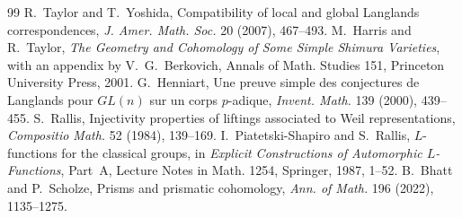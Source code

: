 \documentclass[11pt]{article}
\begin{document}
\begin{thebibliography}{99}
 R.~Taylor and T.~Yoshida, Compatibility of local and global Langlands correspondences, \emph{J. Amer. Math. Soc.} 20 (2007), 467--493.
 M.~Harris and R.~Taylor, \emph{The Geometry and Cohomology of Some Simple Shimura Varieties}, with an appendix by V.~G.~Berkovich, Annals of Math. Studies 151, Princeton University Press, 2001.
 G.~Henniart, Une preuve simple des conjectures de Langlands pour $GL(n)$ sur un corps $p$-adique, \emph{Invent. Math.} 139 (2000), 439--455.
 S.~Rallis, Injectivity properties of liftings associated to Weil representations, \emph{Compositio Math.} 52 (1984), 139--169.
 I.~Piatetski-Shapiro and S.~Rallis, $L$-functions for the classical groups, in \emph{Explicit Constructions of Automorphic $L$-Functions}, Part~A, Lecture Notes in Math. 1254, Springer, 1987, 1--52.
 B.~Bhatt and P.~Scholze, Prisms and prismatic cohomology, \emph{Ann. of Math.} 196 (2022), 1135--1275.
\end{thebibliography}
\end{document}
